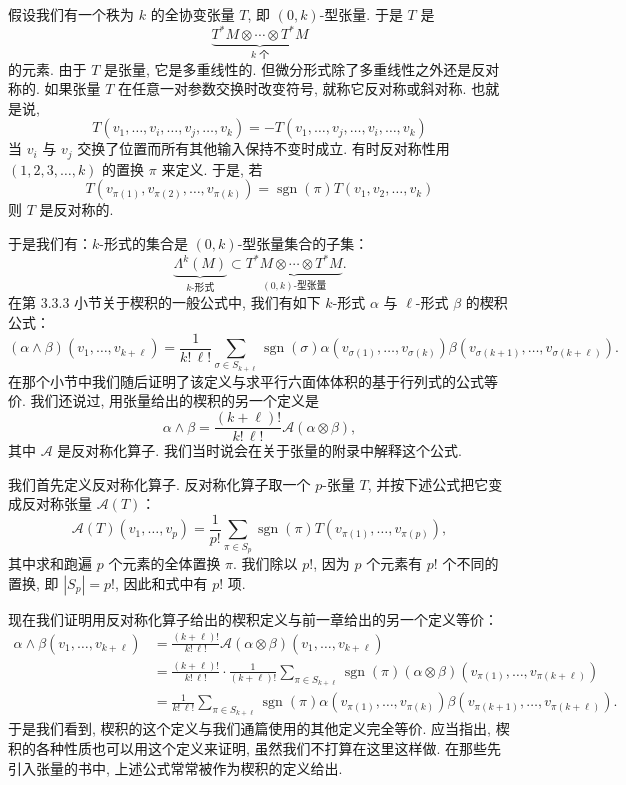 假设我们有一个秩为 $k$ 的全协变张量 $T$, 即 $(0,k)$-型张量. 于是 $T$ 是
\[
\underbrace{T^*M\otimes\cdots\otimes T^*M}_{k\text{ 个}}
\]
的元素. 由于 $T$ 是张量, 它是多重线性的. 但微分形式除了多重线性之外还是反对称的. 如果张量 $T$ 在任意一对参数交换时改变符号, 就称它反对称或斜对称. 也就是说, 
\[
T\left(v_1,\ldots,v_i,\ldots,v_j,\ldots,v_k\right)=-T\left(v_1,\ldots,v_j,\ldots,v_i,\ldots,v_k\right)
\]
当 $v_i$ 与 $v_j$ 交换了位置而所有其他输入保持不变时成立. 有时反对称性用 $(1,2,3,\ldots,k)$ 的置换 $\pi$ 来定义. 于是, 若
\[
T\left(v_{\pi(1)},v_{\pi(2)},\ldots,v_{\pi(k)}\right)=\operatorname{sgn}(\pi)T\left(v_1,v_2,\ldots,v_k\right)
\]
则 $T$ 是反对称的.
\begin{center}
\end{center}
于是我们有：$k$-形式的集合是 $(0,k)$-型张量集合的子集：
\[
\underbrace{\Lambda^k(M)}_{k\text{-形式}}\subset\underbrace{T^*M\otimes\cdots\otimes T^*M}_{(0,k)\text{-型张量}}.
\]
在第 3.3.3 小节关于楔积的一般公式中, 我们有如下 $k$-形式 $\alpha$ 与 $\ell$-形式 $\beta$ 的楔积公式：
\[
\left(\alpha\wedge\beta\right)\left(v_1,\ldots,v_{k+\ell}\right)=\frac{1}{k!\,\ell!}\sum_{\sigma\in S_{k+\ell}}\operatorname{sgn}(\sigma)\alpha\left(v_{\sigma(1)},\ldots,v_{\sigma(k)}\right)\beta\left(v_{\sigma(k+1)},\ldots,v_{\sigma(k+\ell)}\right).
\]
在那个小节中我们随后证明了该定义与求平行六面体体积的基于行列式的公式等价. 我们还说过, 用张量给出的楔积的另一个定义是
\[
\alpha\wedge\beta=\frac{(k+\ell)!}{k!\,\ell!}\mathcal{A}(\alpha\otimes\beta),
\]
其中 $\mathcal{A}$ 是反对称化算子. 我们当时说会在关于张量的附录中解释这个公式.

我们首先定义反对称化算子. 反对称化算子取一个 $p$-张量 $T$, 并按下述公式把它变成反对称张量 $\mathcal{A}(T)$：
\[
\mathcal{A}(T)(v_1,\ldots,v_p)=\frac{1}{p!}\sum_{\pi\in S_p}\operatorname{sgn}(\pi)T\left(v_{\pi(1)},\ldots,v_{\pi(p)}\right),
\]
其中求和跑遍 $p$ 个元素的全体置换 $\pi$. 我们除以 $p!$, 因为 $p$ 个元素有 $p!$ 个不同的置换, 即 $|S_p|=p!$, 因此和式中有 $p!$ 项.

现在我们证明用反对称化算子给出的楔积定义与前一章给出的另一个定义等价：
\begin{align*}
\alpha\wedge\beta\left(v_1,\ldots,v_{k+\ell}\right)
&=\frac{(k+\ell)!}{k!\,\ell!}\mathcal{A}(\alpha\otimes\beta)\left(v_1,\ldots,v_{k+\ell}\right)\\
&=\frac{(k+\ell)!}{k!\,\ell!}\cdot\frac{1}{(k+\ell)!}\sum_{\pi\in S_{k+\ell}}\operatorname{sgn}(\pi)(\alpha\otimes\beta)\left(v_{\pi(1)},\ldots,v_{\pi(k+\ell)}\right)\\
&=\frac{1}{k!\,\ell!}\sum_{\pi\in S_{k+\ell}}\operatorname{sgn}(\pi)\alpha\left(v_{\pi(1)},\ldots,v_{\pi(k)}\right)\beta\left(v_{\pi(k+1)},\ldots,v_{\pi(k+\ell)}\right).
\end{align*}
于是我们看到, 楔积的这个定义与我们通篇使用的其他定义完全等价. 应当指出, 楔积的各种性质也可以用这个定义来证明, 虽然我们不打算在这里这样做. 在那些先引入张量的书中, 上述公式常常被作为楔积的定义给出.

